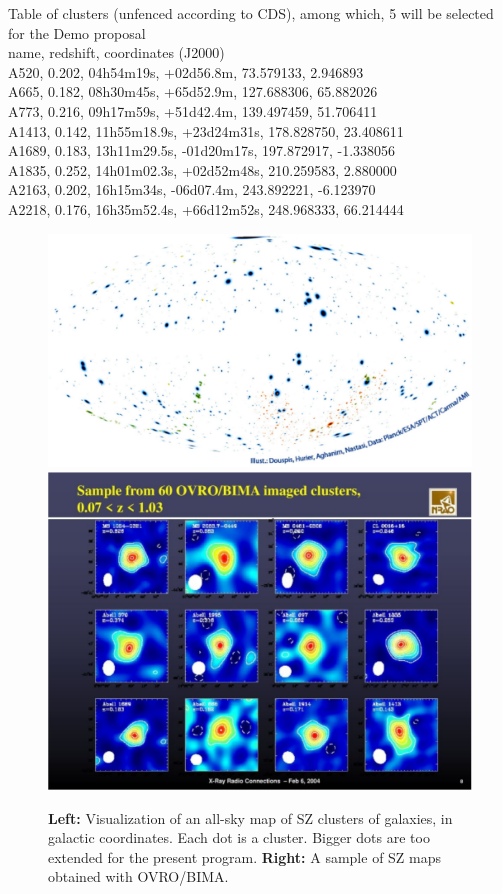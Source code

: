 \documentclass[10pt,a4paper,twoside,graphicx,color]{article}
\begin{document}
Table of  clusters (unfenced according to CDS), among which, 5 will be selected for the Demo proposal\\
name, redshift, coordinates (J2000)\\
A520,  0.202, 04h54m19s,   +02d56.8m,	73.579133, 2.946893 \\
A665,  0.182, 08h30m45s,   +65d52.9m,	127.688306, 65.882026\\
A773,  0.216, 09h17m59s,   +51d42.4m,	139.497459, 51.706411\\
A1413, 0.142, 11h55m18.9s, +23d24m31s,	178.828750, 23.408611\\
A1689, 0.183, 13h11m29.5s, -01d20m17s,	197.872917, -1.338056\\
A1835, 0.252, 14h01m02.3s, +02d52m48s,	210.259583, 2.880000\\
A2163, 0.202, 16h15m34s,   -06d07.4m,   243.892221, -6.123970\\
A2218, 0.176, 16h35m52.4s, +66d12m52s,	248.968333, 66.214444\\

\begin{figure}
  \begin{center}
\includegraphics[width=0.45\columnwidth]{./Figures/Cat_all_colors_cr_DouspisEtAlCrop.pdf}
   \includegraphics[width=0.45\columnwidth]{./Figures/slide_8crop.pdf}
  \end{center}
\caption{{\bf Left:} Visualization of an all-sky map of SZ clusters of galaxies, in galactic coordinates. Each dot is a cluster. Bigger dots are too extended for the present program. {\bf Right: } A sample of SZ maps obtained with OVRO/BIMA. \cite{Reese2002}}

\label{Fig:AllSky}
\end{figure}
\end{document}
